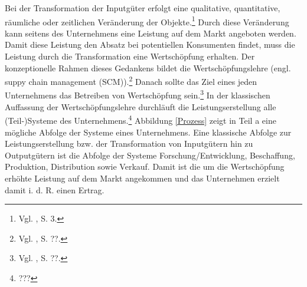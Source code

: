 Bei der Transformation der Inputgüter erfolgt eine qualitative, quantitative, räumliche oder zeitlichen Veränderung der Objekte.\footnote{Vgl. \cite{Dyckhoff2010}, S. 3.} Durch diese Veränderung kann seitens des Unternehmens eine Leistung auf dem Markt angeboten werden. Damit diese Leistung den Absatz bei potentiellen Konsumenten findet, muss die Leistung durch die Transformation eine Wertschöpfung erhalten. Der konzeptionelle Rahmen dieses Gedankens bildet die Wertschöpfungslehre (engl. suppy chain management (SCM)).\footnote{Vgl. \cite{???}, S. ??.} Danach sollte das Ziel eines jeden Unternehmens das Betreiben von Wertschöpfung sein.\footnote{Vgl. \cite{???}, S. ??.} In der klassischen Auffassung der Wertschöpfungslehre durchläuft die Leistungserstellung alle (Teil-)Systeme des Unternehmens.\footnote{???} Abbildung \ref{Prozess} zeigt in Teil a eine mögliche Abfolge der Systeme eines Unternehmens. Eine klassische Abfolge zur Leistungserstellung bzw. der Transformation von Inputgütern hin zu Outputgütern ist die Abfolge der Systeme Forschung/Entwicklung, Beschaffung, Produktion, Distribution sowie Verkauf. Damit ist die um die Wertschöpfung erhöhte Leistung auf dem Markt angekommen und das Unternehmen erzielt damit i. d. R. einen Ertrag.

